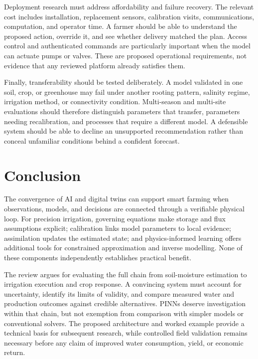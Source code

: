 \documentclass[11pt,a4paper]{article}
\begin{document}
Deployment research must address affordability and failure recovery. The relevant cost includes installation, replacement sensors, calibration visits, communications, computation, and operator time. A farmer should be able to understand the proposed action, override it, and see whether delivery matched the plan. Access control and authenticated commands are particularly important when the model can actuate pumps or valves. These are proposed operational requirements, not evidence that any reviewed platform already satisfies them.

Finally, transferability should be tested deliberately. A model validated in one soil, crop, or greenhouse may fail under another rooting pattern, salinity regime, irrigation method, or connectivity condition. Multi-season and multi-site evaluations should therefore distinguish parameters that transfer, parameters needing recalibration, and processes that require a different model. A defensible system should be able to decline an unsupported recommendation rather than conceal unfamiliar conditions behind a confident forecast.

\section{Conclusion}

\label{sec:10}

The convergence of AI and digital twins can support smart farming when observations, models, and decisions are connected through a verifiable physical loop. For precision irrigation, governing equations make storage and flux assumptions explicit; calibration links model parameters to local evidence; assimilation updates the estimated state; and physics-informed learning offers additional tools for constrained approximation and inverse modelling. None of these components independently establishes practical benefit.

The review argues for evaluating the full chain from soil-moisture estimation to irrigation execution and crop response. A convincing system must account for uncertainty, identify its limits of validity, and compare measured water and production outcomes against credible alternatives. PINNs deserve investigation within that chain, but not exemption from comparison with simpler models or conventional solvers. The proposed architecture and worked example provide a technical basis for subsequent research, while controlled field validation remains necessary before any claim of improved water consumption, yield, or economic return.
\end{document}

